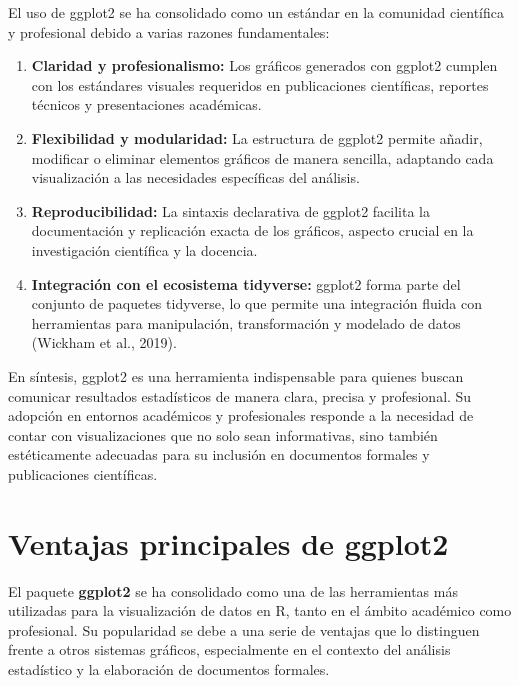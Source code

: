 \documentclass[
  spanish,
  a4paper,
  DIV=11,
  numbers=noendperiod,
  onepage,
  openany]{scrreprt}
\begin{document}
El uso de ggplot2 se ha consolidado como un estándar en la comunidad
científica y profesional debido a varias razones fundamentales:

\begin{enumerate}
\def\labelenumi{\arabic{enumi}.}
\item
  \textbf{Claridad y profesionalismo:} Los gráficos generados con
  ggplot2 cumplen con los estándares visuales requeridos en
  publicaciones científicas, reportes técnicos y presentaciones
  académicas.
\item
  \textbf{Flexibilidad y modularidad:} La estructura de ggplot2 permite
  añadir, modificar o eliminar elementos gráficos de manera sencilla,
  adaptando cada visualización a las necesidades específicas del
  análisis.
\item
  \textbf{Reproducibilidad:} La sintaxis declarativa de ggplot2 facilita
  la documentación y replicación exacta de los gráficos, aspecto crucial
  en la investigación científica y la docencia.
\item
  \textbf{Integración con el ecosistema tidyverse:} ggplot2 forma parte
  del conjunto de paquetes tidyverse, lo que permite una integración
  fluida con herramientas para manipulación, transformación y modelado
  de datos (Wickham et al., 2019).
\end{enumerate}

En síntesis, ggplot2 es una herramienta indispensable para quienes
buscan comunicar resultados estadísticos de manera clara, precisa y
profesional. Su adopción en entornos académicos y profesionales responde
a la necesidad de contar con visualizaciones que no solo sean
informativas, sino también estéticamente adecuadas para su inclusión en
documentos formales y publicaciones científicas.

\section{Ventajas principales de
ggplot2}\label{ventajas-principales-de-ggplot2}

El paquete \textbf{ggplot2} se ha consolidado como una de las
herramientas más utilizadas para la visualización de datos en R, tanto
en el ámbito académico como profesional. Su popularidad se debe a una
serie de ventajas que lo distinguen frente a otros sistemas gráficos,
especialmente en el contexto del análisis estadístico y la elaboración
de documentos formales.
\end{document}

